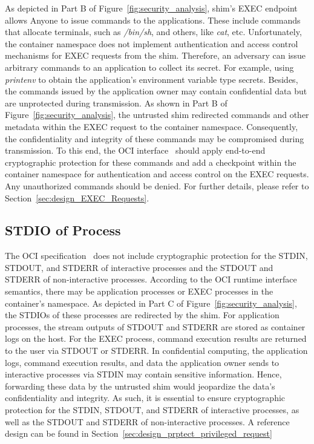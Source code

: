 As depicted in Part B of Figure~\ref{fig:security_analysis}, shim's EXEC endpoint allows Anyone to issue commands to the applications. These include commands that allocate terminals, such as \emph{/bin/sh}, and others, like \emph{cat}, etc. Unfortunately, the container namespace does not implement authentication and access control mechanisms for EXEC requests from 
the shim. Therefore, an adversary can issue arbitrary commands to an application to collect its secret. For example, using \emph{printenv} to obtain the application's environment variable type secrets. Besides, the commands issued by the application owner may contain confidential data but are unprotected during transmission. As shown in Part B of Figure~\ref{fig:security_analysis}, the untrusted 
shim redirected commands and other metadata within the EXEC request to the container namespace. Consequently, the confidentiality and integrity of these commands may be compromised during transmission. To this end, the OCI interface~\cite*{oci-runtime-spec} should apply end-to-end cryptographic protection for these commands and add a checkpoint within the 
container namespace for authentication and access control on the EXEC requests. Any unauthorized commands should be denied. For further details, please refer to Section~\ref{sec:design_EXEC_Requests}.


\subsection{STDIO of Process}
\label{sec:security_analyse_STDIO_oci}
The OCI specification~\cite*{oci-runtime-spec} does not include cryptographic protection for the STDIN, STDOUT, and STDERR  of interactive processes and the STDOUT and STDERR of non-interactive processes. According to the OCI runtime interface semantics, there may be application processes or EXEC processes in the container's namespace. As depicted in Part C of 
Figure~\ref{fig:security_analysis}, the STDIOs of these processes are redirected by the shim. For application processes, the stream outputs of STDOUT and STDERR are stored as container logs on the host. For the EXEC process, command execution results are returned to the user via STDOUT or STDERR. In confidential computing, the application logs, command execution 
results, and data the application owner sends to interactive processes via STDIN may contain sensitive information. Hence, forwarding these data by the untrusted shim would jeopardize the data's confidentiality and integrity. As such, it is essential to ensure cryptographic protection for the STDIN, STDOUT, and STDERR of interactive processes, as well as 
the STDOUT and STDERR of non-interactive processes. A reference design can be found in Section~\ref{sec:design_prptect_privileged_request}

